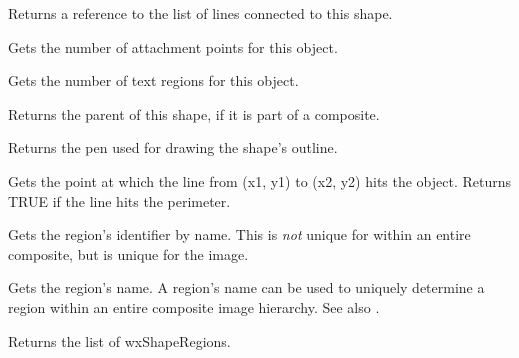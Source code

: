 Returns a reference to the list of lines connected to this shape.



Gets the number of attachment points for this object.



Gets the number of text regions for this object.



Returns the parent of this shape, if it is part of a composite.



Returns the pen used for drawing the shape's outline.



Gets the point at which the line from (x1, y1) to (x2, y2) hits the object. Returns TRUE if the
line hits the perimeter.

\label{getregionid}


Gets the region's identifier by name. This is {\it not} unique for within an entire composite, but
is unique for the image.

\label{getregionname}


Gets the region's name. A region's name can be used to uniquely determine a region within
an entire composite image hierarchy. See also .

\label{getregions}


Returns the list of wxShapeRegions.


